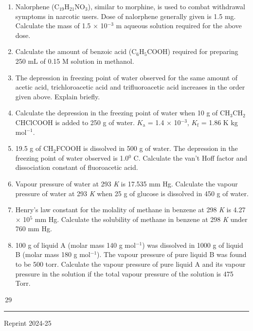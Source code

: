 \documentclass[11pt,a4paper]{article}
\begin{document}
\begin{minipage}[t]{0.955\textwidth}
\begin{tcolorbox}
\begin{enumerate}[label=\textbf{1.\arabic*},leftmargin=38pt,itemsep=3pt,topsep=0pt,start=22]
\item Nalorphene (C$_{19}$H$_{21}$NO$_3$), similar to morphine, is used to combat withdrawal symptoms in narcotic users. Dose of nalorphene generally given is 1.5 mg. Calculate the mass of 1.5 $\times$ 10$^{-3}$ m aqueous solution required for the above dose.
\item Calculate the amount of benzoic acid (C$_6$H$_5$COOH) required for preparing 250 mL of 0.15 M solution in methanol.
\item The depression in freezing point of water observed for the same amount of acetic acid, trichloroacetic acid and trifluoroacetic acid increases in the order given above. Explain briefly.
\item Calculate the depression in the freezing point of water when 10 g of CH$_3$CH$_2$CHClCOOH is added to 250 g of water. $K_\text{a}$ = 1.4 $\times$ 10$^{-3}$, $K_\text{f}$ = 1.86 K kg mol$^{-1}$.
\item 19.5 g of CH$_2$FCOOH is dissolved in 500 g of water. The depression in the freezing point of water observed is 1.0$^0$ C. Calculate the van't Hoff factor and dissociation constant of fluoroacetic acid.
\item Vapour pressure of water at 293 \textit{K} is 17.535 mm Hg. Calculate the vapour pressure of water at 293 \textit{K} when 25 g of glucose is dissolved in 450 g of water.
\item Henry's law constant for the molality of methane in benzene at 298 \textit{K} is 4.27 $\times$ 10$^5$ mm Hg. Calculate the solubility of methane in benzene at 298 \textit{K} under 760 mm Hg.
\item 100 g of liquid A (molar mass 140 g mol$^{-1}$) was dissolved in 1000 g of liquid B (molar mass 180 g mol$^{-1}$). The vapour pressure of pure liquid B was found to be 500 torr. Calculate the vapour pressure of pure liquid A and its vapour pressure in the solution if the total vapour pressure of the solution is 475 Torr.
\end{enumerate}
\end{tcolorbox}
\end{minipage}

\vfill
\noindent\hfill\begin{minipage}{0.33\textwidth}
\colorbox{Goldenrod1}{\color{gray}\,29\,}\\[-6pt]
{\color{Goldenrod1}\rule{\linewidth}{1pt}}
\end{minipage}
\begin{center}
{\sffamily\small Reprint 2024-25}
\end{center}
\end{document}
